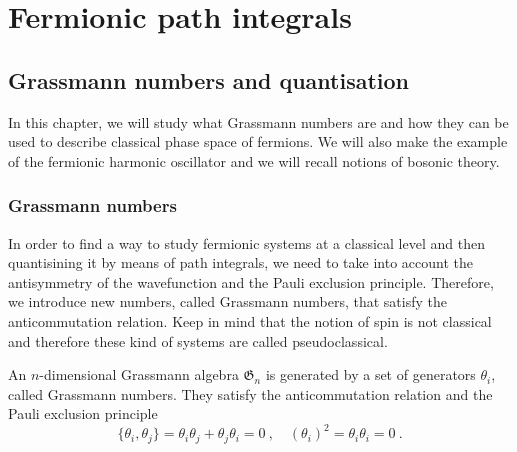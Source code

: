 \part{Fermionic path integrals}

\chapter{Grassmann numbers and quantisation}

    In this chapter, we will study what Grassmann numbers are and how they can be used to describe classical phase space of fermions. We will also make the example of the fermionic harmonic oscillator and we will recall notions of bosonic theory.

\section{Grassmann numbers} 

    In order to find a way to study fermionic systems at a classical level and then quantisining it by means of path integrals, we need to take into account the antisymmetry of the wavefunction and the Pauli exclusion principle. Therefore, we introduce new numbers, called Grassmann numbers, that satisfy the anticommutation relation. Keep in mind that the notion of spin is not classical and therefore these kind of systems are called pseudoclassical.
    
    An $n$-dimensional Grassmann algebra $\mathfrak G_n$ is generated by a set of generators $\theta_i$, called Grassmann numbers. They satisfy the anticommutation relation and the Pauli exclusion principle
    \begin{equation}\label{f:anti}
        \{\theta_i, \theta_j\} = \theta_i \theta_j + \theta_j \theta_i = 0 ~, \quad (\theta_i)^2 = \theta_i \theta_i = 0 ~.
    \end{equation}

